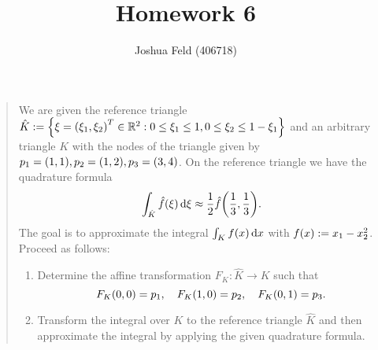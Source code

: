 \documentclass[english]{exercise}
\title{Homework 6}
\author{Joshua Feld (406718)}
\begin{document}
    \maketitle


    \section{}

    \begin{quote}
        We are given the reference triangle \(\hat{K} := \braces*{\xi = \parentheses*{\xi_1, \xi_2}^T \in \R^2 : 0 \le \xi_1 \le 1, 0 \le \xi_2 \le 1 - \xi_1}\) and an arbitrary triangle \(K\) with the nodes of the triangle given by \(p_1 = \parentheses*{1, 1}, p_2 = \parentheses*{1, 2}, p_3 = \parentheses*{3, 4}\).
        On the reference triangle we have the quadrature formula
        \[
            \int_{\hat{K}}\hat{f}\parentheses*{\xi}\d\xi \approx \frac{1}{2}\hat{f}\parentheses*{\frac{1}{3}, \frac{1}{3}}.
        \]
        The goal is to approximate the integral \(\int_K f\parentheses*{x}\d x\) with \(f\parentheses*{x} := x_1 - x_2^2\).
        Proceed as follows:
        \begin{enumerate}
            \item Determine the affine transformation \(F_K: \hat{K} \to K\) such that
            \[
                F_K\parentheses*{0, 0} = p_1, \quad F_K\parentheses*{1, 0} = p_2, \quad F_K\parentheses*{0, 1} = p_3.
            \]
            \item Transform the integral over \(K\) to the reference triangle \(\hat{K}\) and then approximate the integral by applying the given quadrature formula.
        \end{enumerate}
    \end{quote}
    
\end{document}
